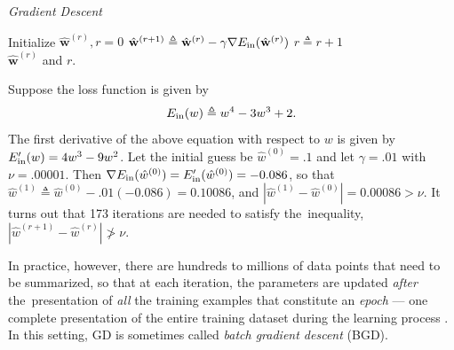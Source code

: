\begin{algorithm}
\caption{\it Gradient Descent}
\label{algo:GD}
\begin{algorithmic}[1]\vspace{.2cm}
\item Initialize $\hat{\mathbf{w}}^{(r)},r=0$\vspace{.2cm}
\vspace{.2cm}
\State $\hat{\mathbf{w}}^{(r+1)}\triangleq \hat{\mathbf{w}}^{(r)} - \gamma\nabla E_{\mathrm{in}}(\hat{\mathbf{w}}^{(r)})$\vspace{.2cm}
\State $r\triangleq r + 1$\vspace{.2cm}
\EndWhile\\\vspace{.2cm}
\Return $\hat{\mathbf{w}}^{(r)}$ and $r$.
\end{algorithmic}
\end{algorithm}
\vspace{-.3cm}

\begin{exmp}\label{ex:gd}
Suppose the loss function is given by
\begin{equation}\label{eq:errgd1}
E_{\mathrm{in}}(w)\triangleq w^4 - 3w^3 + 2.
\end{equation}
The first derivative of the above equation with respect to $w$ is given by ${E_{\mathrm{in}}'(w)=4w^3-9w^2}$. Let the initial guess be $\hat{w}^{(0)}=.1$ and let $\gamma=.01$ with $\nu=.00001$. Then $\nabla E_{\mathrm{in}}(\hat{w}^{(0)})=E_{\mathrm{in}}'(\hat{w}^{(0)})=-0.086$, so that $\hat{w}^{(1)}\triangleq\hat{w}^{(0)}-.01(-0.086)=0.10086$, and $|\hat{w}^{(1)} - \hat{w}^{(0)}| = 0.00086> \nu$. It turns out that 173 iterations are needed to satisfy \mbox{the inequality}, $|\hat{w}^{(r+1)} - \hat{w}^{(r)}| \ngtr \nu$.
\end{exmp}
In practice, however, there are hundreds to millions of data points that need to be summarized, so that at each iteration, the parameters are updated \textit{after} \mbox{the presentation} of \textit{all} the training examples that constitute an \textit{epoch} --- one complete presentation of the entire training dataset during the learning process \cite{Haykin1998}. In this setting, GD is sometimes called \textit{batch gradient descent} (BGD).
